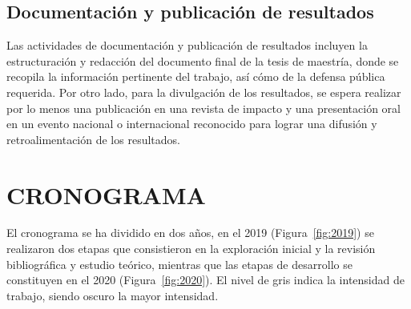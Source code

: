 \documentclass[letter, 12 pt]{article}
\begin{document}
	\subsection{Documentación y publicación de resultados}
Las actividades de documentación y publicación de resultados incluyen la estructuración y redacción del documento final de la tesis de maestría, donde se recopila la información pertinente del trabajo, así cómo de la defensa pública requerida. Por otro lado, para la divulgación de los resultados, se espera realizar por lo menos una publicación en una revista de impacto y una presentación oral en un evento nacional o internacional reconocido para lograr una difusión y retroalimentación de los resultados. %


\section{CRONOGRAMA} \label{sec:cronograma}

El cronograma se ha dividido en dos años, en el 2019 (Figura~\ref{fig:2019}) se realizaron dos etapas que consistieron en la exploración inicial y la revisión bibliográfica y estudio teórico, mientras que las etapas de desarrollo se constituyen en el 2020 (Figura~\ref{fig:2020}). El nivel de gris indica la intensidad de trabajo, siendo oscuro la mayor intensidad. \\
\end{document}
